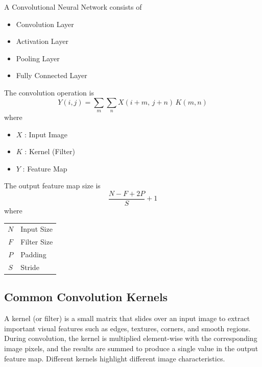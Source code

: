 \documentclass[11pt]{article}
\begin{document}
A Convolutional Neural Network consists of
\begin{itemize}
    \item Convolution Layer
    \item Activation Layer
    \item Pooling Layer
    \item Fully Connected Layer
\end{itemize}

The convolution operation is
\begin{equation}
Y(i,j) = \sum_{m}\sum_{n} X(i+m,\, j+n)\, K(m,n)
\end{equation}
where
\begin{itemize}
    \item $X$ : Input Image
    \item $K$ : Kernel (Filter)
    \item $Y$ : Feature Map
\end{itemize}

The output feature map size is
\begin{equation}
\frac{N - F + 2P}{S} + 1
\end{equation}
where
\begin{center}
\begin{tabular}{cl}
$N$ & Input Size \\
$F$ & Filter Size \\
$P$ & Padding \\
$S$ & Stride \\
\end{tabular}
\end{center}

\subsection{Common Convolution Kernels}

A kernel (or filter) is a small matrix that slides over an input image to extract important visual features such as edges, textures, corners, and smooth regions. During convolution, the kernel is multiplied element-wise with the corresponding image pixels, and the results are summed to produce a single value in the output feature map. Different kernels highlight different image characteristics.
\end{document}

